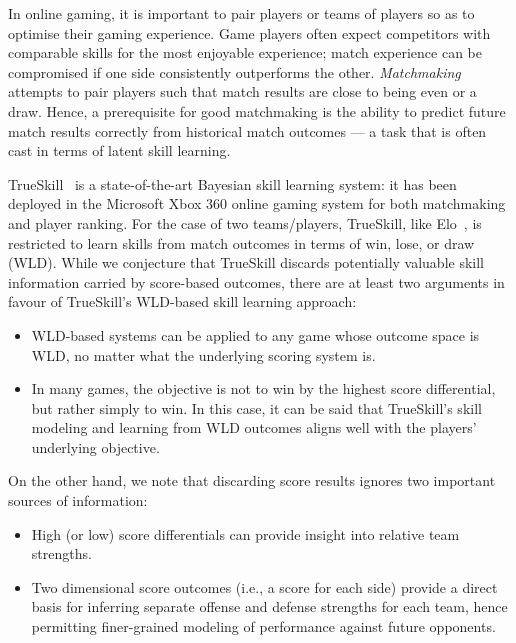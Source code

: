 In online gaming, it is important to pair players or teams of players
so as to optimise their gaming experience.  Game players often expect
competitors with comparable skills for the most enjoyable experience;
match experience can be compromised if one side consistently
outperforms the other.  \emph{Matchmaking} attempts to pair players
such that match results are close to being even or a draw.  Hence, a
prerequisite for good matchmaking is the ability to predict future
match results correctly from historical match outcomes --- a task
that is often cast in terms of latent skill learning.

TrueSkill~\cite{herbrich06569} is a state-of-the-art Bayesian skill
learning system: it has been deployed in the Microsoft Xbox 360 online
gaming system for both matchmaking and player ranking.  For the case
of two teams/players, TrueSkill, like
Elo~\cite{elo78TheRatingOfChessPlayers}, is restricted to learn skills
from match outcomes in terms of win, lose, or draw (WLD).
While we conjecture that TrueSkill discards potentially
valuable skill information carried by score-based outcomes,
there are at least two arguments in favour of TrueSkill's WLD-based
skill learning approach:
\begin{itemize}
\item WLD-based systems can be applied to any game whose outcome space
is WLD, no matter what the underlying scoring system is.
\item In many games, the objective is not to win by the highest
score differential, but rather simply to win.  In this case,
it can be said that TrueSkill's skill modeling and learning from WLD
outcomes aligns well with the players' underlying objective.
\end{itemize}
On the other hand, we note that discarding score results
ignores two important sources of information:
\begin{itemize}
\item High (or low) score
differentials can provide insight into relative team strengths.
\item Two dimensional score outcomes (i.e., a score for each side) provide a
direct basis for inferring separate offense and defense strengths for
each team, hence permitting finer-grained modeling of performance against
future opponents.
\end{itemize}

